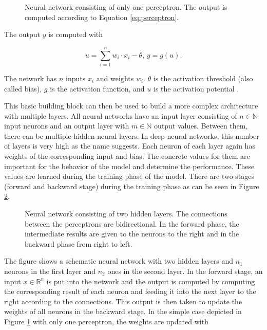 \begin{figure}[H]
	\centering
	\def\svgscale{0.5}
	
	\caption{ Neural network consisting of only one perceptron. The output is computed according to Equation \ref{eq:perceptron}.}
	\label{fig:perceptron}
\end{figure}

The output $ y $ is computed with 

\begin{equation}
	\label{eq:perceptron}
	u = \sum_{i=1}^n w_i \cdot x_i - \theta  \text{,   } y = g(u).
\end{equation}

The network has $ n $ inputs $ x_i $ and weights $ w_i $. $ \theta $ is the activation threshold (also called bias), $ g $ is the activation function, and $ u $ is the activation potential \cite{da2017artificial}. 

This basic building block can then be used to build a more complex architecture with multiple layers. All neural networks have an input layer consisting of $ n \in \mathbb{N}$ input neurons and an output layer with $ m \in \mathbb{N} $ output values. Between them, there can be multiple hidden neural layers. In deep neural networks, this number of layers is very high as the name suggests. Each neuron of each layer again has weights of the corresponding input and bias. The concrete values for them are important for the behavior of the model and determine the performance. These values are learned during the training phase of the model. There are two stages (forward and backward stage) during the training phase as can be seen in Figure \ref{fig:network}.

\begin{figure}[H]
	\centering
	\def\svgscale{0.5}
	
	\caption{ Neural network consisting of two hidden layers. The connections between the perceptrons are bidirectional. In the forward phase, the intermediate results are given to the neurons to the right and in the backward phase from right to left. }
	\label{fig:network}
\end{figure}

The figure shows a schematic neural network with two hidden layers and $ n_1 $ neurons in the first layer and $ n_2 $ ones in the second layer. In the forward stage, an input $ x \in \mathbb{R}^n $ is put into the network and the output is computed by computing the corresponding result of each neuron and feeding it into the next layer to the right according to the connections. This output is then taken to update the weights of all neurons in the backward stage. In the simple case depicted in Figure \ref{fig:perceptron} with only one perceptron, the weights are updated with  

